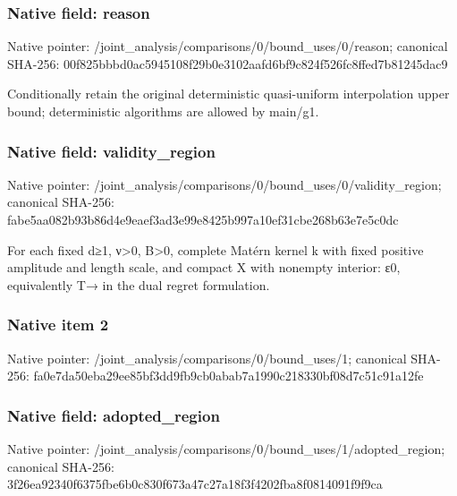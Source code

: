 \documentclass[10pt,a4paper]{article}
\begin{document}
\subsubsection{Native field: reason}
Native pointer: /joint\_\allowbreak{}analysis/comparisons/0/bound\_\allowbreak{}uses/0/reason; canonical SHA-256: 00f825bbbd0ac5945108f29b0e3102aafd6bf9c824f526fc8ffed7b81245dac9

\begingroup\raggedright\sloppy Conditionally retain the original deterministic quasi-uniform interpolation upper bound;\allowbreak{} deterministic algorithms are allowed by main/\allowbreak{}g1.\par\endgroup

\subsubsection{Native field: validity\_\allowbreak{}region}
Native pointer: /joint\_\allowbreak{}analysis/comparisons/0/bound\_\allowbreak{}uses/0/validity\_\allowbreak{}region; canonical SHA-256: fabe5aa082b93b86d4e9eaef3ad3e99e8425b997a10ef31cbe268b63e7e5c0dc

\begingroup\raggedright\sloppy For each fixed d{\AtlasUnicodeSymbols ≥}\allowbreak{}1,\allowbreak{} {\AtlasUnicodeText ν}\allowbreak{}>0,\allowbreak{} B>0,\allowbreak{} complete Mat{\AtlasUnicodeText é}\allowbreak{}rn kernel k with fixed positive amplitude and length scale,\allowbreak{} and compact X with nonempty interior:\allowbreak{} {\AtlasUnicodeText ε}\allowbreak{}0,\allowbreak{} equivalently T{\AtlasUnicodeSymbols →}\allowbreak{} in the dual regret formulation.\par\endgroup

\subsubsection{Native item 2}
Native pointer: /joint\_\allowbreak{}analysis/comparisons/0/bound\_\allowbreak{}uses/1; canonical SHA-256: fa0e7da50eba29ee85bf3dd9fb9cb0abab7a1990c218330bf08d7c51c91a12fe

\subsubsection{Native field: adopted\_\allowbreak{}region}
Native pointer: /joint\_\allowbreak{}analysis/comparisons/0/bound\_\allowbreak{}uses/1/adopted\_\allowbreak{}region; canonical SHA-256: 3f26ea92340f6375fbe6b0c830f673a47c27a18f3f4202fba8f0814091f9f9ca
\end{document}
